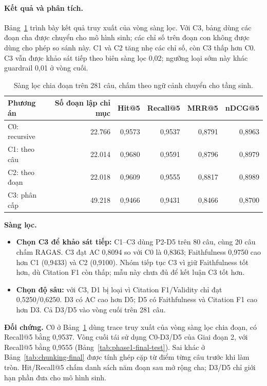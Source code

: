 \paragraph{Kết quả và phân tích.}
Bảng~\ref{tab:chunking-screen} trình bày kết quả truy xuất của vòng sàng lọc. Với C3, bảng dùng các đoạn cha được chuyển cho mô hình sinh; các chỉ số trên đoạn con không được dùng cho phép so sánh này. C1 và C2 tăng nhẹ các chỉ số, còn C3 thấp hơn C0. C3 vẫn được khảo sát tiếp theo biên sàng lọc 0,02; ngưỡng loại sớm này khác guardrail 0,01 ở vòng cuối.
\begin{table}[H]\centering\small{}
\caption{Sàng lọc chia đoạn trên 281 câu, chấm theo ngữ cảnh chuyển cho tầng sinh.}\label{tab:chunking-screen}
\begin{tabular}{@{}lrrrrr@{}}\toprule
\textbf{Phương án} & \textbf{Số đoạn lập chỉ mục} & \textbf{Hit@5} & \textbf{Recall@5} & \textbf{MRR@5} & \textbf{nDCG@5}\\\midrule
C0: recursive & 22.766 & 0,9573 & 0,9537 & 0,8791 & 0,8963\\
C1: theo câu & 22.014 & 0,9680 & 0,9591 & 0,8796 & 0,8979\\
C2: theo đoạn & 22.018 & 0,9609 & 0,9555 & 0,8817 & 0,8989\\
C3: phân cấp & 49.218 & 0,9466 & 0,9431 & 0,8466 & 0,8700\\\bottomrule
\end{tabular}
\end{table}

\textbf{Sàng lọc.}
\begin{itemize}
\item \textbf{Chọn C3 để khảo sát tiếp:} C1--C3 dùng P2-D5 trên 80 câu, cùng 20 câu chấm RAGAS. C3 đạt AC 0,8094 so với C0 là 0,8363; Faithfulness 0,9750 cao hơn C1 (0,9433) và C2 (0,9100). Nhóm tiếp tục C3 vì giữ Faithfulness tốt hơn, dù Citation F1 còn thấp; mẫu này chưa đủ để kết luận C3 tốt hơn.
\item \textbf{Chọn độ sâu:} với C3, D1 bị loại vì Citation F1/Validity chỉ đạt 0,5250/0,6250. D3 có AC cao hơn D5; D5 có Faithfulness và Citation F1 cao hơn D3. Cả D3/D5 vào vòng cuối trên 281 câu.
\end{itemize}

\textbf{Đối chứng.} C0 ở Bảng~\ref{tab:chunking-screen} dùng trace truy xuất của vòng sàng lọc chia đoạn, có Recall@5 bằng 0,9537. Vòng cuối tái sử dụng C0-D3/D5 của Giai đoạn 2, với Recall@5 bằng 0,9555 (Bảng~\ref{tab:phase1-final-test}). Sai khác ở Bảng~\ref{tab:chunking-final} được tính ghép cặp từ điểm từng câu trước khi làm tròn. Hit/Recall@5 chấm danh sách năm đoạn sau mở rộng cha; D3/D5 chỉ giới hạn phần đưa cho mô hình sinh.

